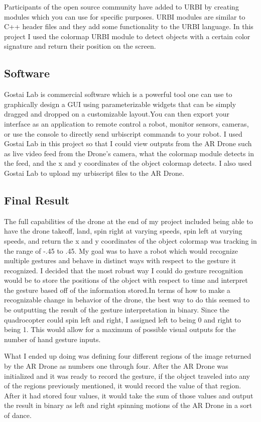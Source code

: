 \documentclass[a4paper,12pt]{report}
\begin{document}
Participants of the open source community have added to URBI by creating modules which you can use for specific purposes. URBI modules are similar to C++ header files and they add some functionality to the URBI language. In this project I used the colormap URBI module to detect objects with a certain color signature and return their position on the screen.
\subsection{Software}

Gostai Lab is commercial software which is a powerful tool one can use to graphically design a GUI using parameterizable widgets that can be simply dragged and dropped on a customizable layout.You can then export your interface as an application to remote control a robot, monitor sensors, cameras, or use the console to directly send urbiscript commands to your robot. I used Gostai Lab in this project so that I could view outputs from the AR Drone such as live video feed from the Drone's camera, what the colormap module detects in the feed, and the x and y coordinates of the object colormap detects. I also used Gostai Lab to upload my urbiscript files to the AR Drone.
\subsection{Final Result}
The full capabilities of the drone at the end of my project included being able to have the drone takeoff, land, spin right at varying speeds, spin left at varying speeds, and return the x and y coordinates of the object colormap was tracking in the range of -.45 to .45. My goal was to have a robot which would recognize multiple gestures and behave in distinct ways with respect to the gesture it recognized. I decided that the most robust way I could do gesture recognition would be to store the positions of the object with respect to time and interpret the gesture based off of the information stored.In terms of how to make a recognizable change in behavior of the drone, the best way to do this seemed to be outputting the result of the gesture interpretation in binary. Since the quadrocopter could spin left and right, I assigned left to being 0 and right to being 1. This would allow for a maximum of possible visual outputs for the number of hand gesture inputs.

What I ended up doing was defining four different regions of the image returned by the AR Drone as numbers one through four. After the AR Drone was initialized and it was ready to record the gesture, if the object traveled into any of the regions previously mentioned, it would record the value of that region. After it had stored four values, it would take the sum of those values and output the result in binary as left and right spinning motions of the AR Drone in a sort of dance. 
\end{document}
